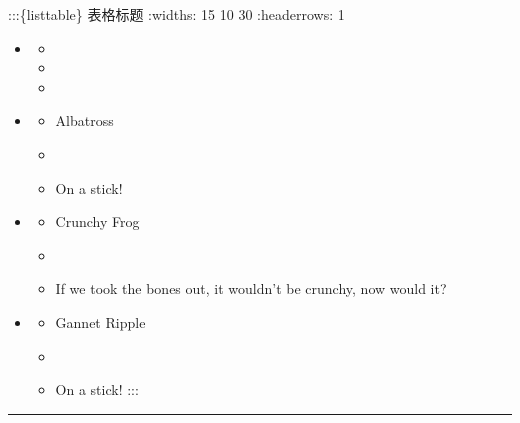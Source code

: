\documentclass[letterpaper,10pt,english]{sphinxmanual}
\begin{document}
\sphinxAtStartPar
:::\{list\sphinxhyphen{}table\} 表格标题
:widths: 15 10 30
:header\sphinxhyphen{}rows: 1
\begin{itemize}
\item {} \begin{itemize}
\item {} 
\sphinxAtStartPar
{}

\item {} 
\sphinxAtStartPar
{}

\item {} 
\sphinxAtStartPar
{}

\end{itemize}

\item {} \begin{itemize}
\item {} 
\sphinxAtStartPar
Albatross

\item {} 

\item {} 
\sphinxAtStartPar
On a stick!

\end{itemize}

\item {} \begin{itemize}
\item {} 
\sphinxAtStartPar
Crunchy Frog

\item {} 

\item {} 
\sphinxAtStartPar
If we took the bones out, it wouldn’t be
crunchy, now would it?

\end{itemize}

\item {} \begin{itemize}
\item {} 
\sphinxAtStartPar
Gannet Ripple

\item {} 

\item {} 
\sphinxAtStartPar
On a stick!
:::

\end{itemize}

\end{itemize}


\bigskip\hrule\bigskip
\end{document}
